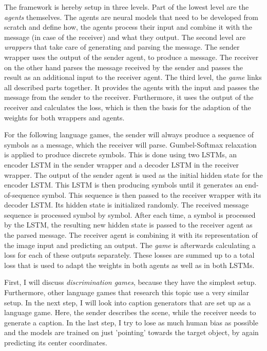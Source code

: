 The framework is hereby setup in three levels.
Part of the lowest level are the \emph{agents} themselves.
The agents are neural models that need to be developed from scratch and define how, the agents process their input and combine it with the message (in case of the receiver) and what they output.
The second level are \emph{wrappers} that take care of generating and parsing the message.
The sender wrapper uses the output of the sender agent, to produce a message.
The receiver on the other hand parses the message received by the sender and passes the result as an additional input to the receiver agent.
The third level, the \emph{game} links all described parts together.
It provides the agents with the input and passes the message from the sender to the receiver.
Furthermore, it uses the output of the receiver and calculates the loss, which is then the basis for the adaption of the weights for both wrappers and agents.

For the following language games, the sender will always produce a sequence of symbols as a message, which the receiver will parse.
Gumbel-Softmax relaxation is applied to produce discrete symbols.
This is done using two LSTMs, an encoder LSTM in the sender wrapper and a decoder LSTM in the receiver wrapper.
The output of the sender agent is used as the initial hidden state for the encoder LSTM.
This LSTM is then producing symbols until it generates an end-of-sequence symbol.
This sequence is then passed to the receiver wrapper with its decoder LSTM.
Its hidden state is initialized randomly.
The received message sequence is processed symbol by symbol.
After each time, a symbol is processed by the LSTM, the resulting new hidden state is passed to the receiver agent as the parsed message.
The receiver agent is combining it with its representation of the image input and predicting an output.
The \emph{game} is afterwards calculating a loss for each of these outputs separately.
These losses are summed up to a total loss that is used to adapt the weights in both agents as well as in both LSTMs.


First, I will discuss \emph{discrimination games}, because they have the simplest setup.
Furthermore, other language games that research this topic use a very similar setup.
In the next step, I will look into caption generators that are set up as a language game.
Here, the sender describes the scene, while the receiver needs to generate a caption.
In the last step, I try to lose as much human bias as possible and the models are trained on just 'pointing' towards the target object, by again predicting its center coordinates.

